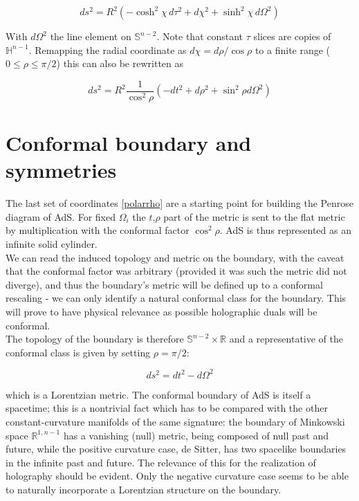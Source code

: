 \documentclass[11pt,a4paper,oneside,openright,titlepage]{book}
\begin{document}
\begin{equation}
ds^2 = R^2 \left( -\cosh^2 \chi \, d\tau^2 + d\chi^2 + \sinh^2 \chi \, d\Omega^2 \right)
\end{equation}

With $d\Omega^2$ the line element on $\mathbb{S}^{n-2}$. Note that constant $\tau$ slices are copies of $\mathbb{H}^{n-1}$. Remapping the radial coordinate as $d\chi = d\rho/\cos\rho$ to a finite range ($0\le \rho \le \pi/2$) this can also be rewritten as

\begin{equation} \label{polarrho}
	ds^2 = R^2 \frac{1}{\cos^{2} \rho} \left( - dt^2 + d\rho^2 + \sin^2 \rho d\Omega^2  \right)
\end{equation}

\section{Conformal boundary and symmetries}

The last set of coordinates \ref{polarrho} are a starting point for building the Penrose diagram of AdS. For fixed $\Omega_i$ the $t$,$\rho$ part of the metric is sent to the flat metric by multiplication with the conformal factor $\cos^2 \rho$. AdS is thus represented as an infinite solid cylinder.\\

We can read the induced topology and metric on the boundary, with the caveat that the conformal factor was arbitrary (provided it was such the metric did not diverge), and thus the boundary's metric will be defined up to a conformal rescaling - we can only identify a natural conformal class for the boundary. This will prove to have physical relevance as possible holographic duals will be conformal.\\

The topology of the boundary is therefore $\mathbb{S}^{n-2} \times \mathbb{R}$ and a representative of the conformal class is given by setting $\rho = \pi/2$:

\begin{equation}
	ds^2 = dt^2 - d\Omega^2 
\end{equation}

which is a Lorentzian metric. The conformal boundary of AdS is itself a spacetime; this is a nontrivial fact which has to be compared with the other constant-curvature manifolds of the same signature: the boundary of Minkowski space $\mathbb{R}^{1,n-1}$ has a vanishing (null) metric, being composed of null past and future, while the positive curvature case, de Sitter, has two spacelike boundaries in the infinite past and future. The relevance of this for the realization of holography should be evident. Only the negative curvature case seems to be able to naturally incorporate a Lorentzian structure on the boundary.\\
\end{document}
